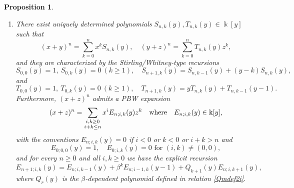 \documentclass{amsart}
\newtheorem{proposition}[theorem]{Proposition}
\theoremstyle{definition}
\theoremstyle{remark}
\numberwithin{equation}{section}
\begin{document}
\begin{proposition}
\begin{enumerate}
\item[\rm (5)] There exist uniquely determined polynomials $S_{n,k}(y),T_{n,k}(y)\in\Bbbk[y]$ such that
\begin{equation}\label{binomxy2i}
(x+y)^n=\sum_{k=0}^{n} x^kS_{n,k}(y), \quad (y+z)^n=\sum_{k=0}^{n} T_{n,k}(y)z^k,
\end{equation}
and they are characterized by the Stirling/Whitney-type recursions
\[
S_{0,0}(y)=1,\ S_{0,k}(y)=0\ (k\ge 1),\quad S_{n+1,k}(y)=S_{n,k-1}(y)+(y-k) S_{n,k}(y),
\]
and 
\[
T_{0,0}(y)=1,\ T_{0,k}(y)=0\ (k\ge 1),\quad T_{n+1,k}(y)=y T_{n,k}(y)+T_{n,k-1}(y-1).
\]
Furthermore, $(x+z)^n$ admits a PBW expansion
\begin{equation}\label{Edefxz2i}
(x+z)^n=\sum_{\substack{i,k\ge 0\\ i+k\le n}} x^{ i}E_{n;i,k}(y) z^{k} \quad {\rm where} \quad E_{n;i,k}(y)\in\Bbbk[y],
\end{equation}
with the conventions $E_{n;i,k}(y)=0$ if $i<0$ or $k<0$ or $i+k>n$ and
\[
E_{0;0,0}(y)=1,\quad E_{0;i,k}(y)=0 \text{ for }(i,k)\neq(0,0),
\]
and for every $n\ge 0$ and all $i,k\ge 0$ we have the explicit recursion
\begin{equation}\label{Erecexplicit2i}
E_{n+1;i,k}(y)=E_{n;i,k-1}(y)+\beta^{k}E_{n;i-1,k}(y-1)+Q_{k+1}(y)E_{n;i,k+1}(y),
\end{equation}
where $Q_r(y)$ is the $\beta$-dependent polynomial defined in relation \eqref{Qmdef2i}.
\end{enumerate}
\end{proposition}
\end{document}
